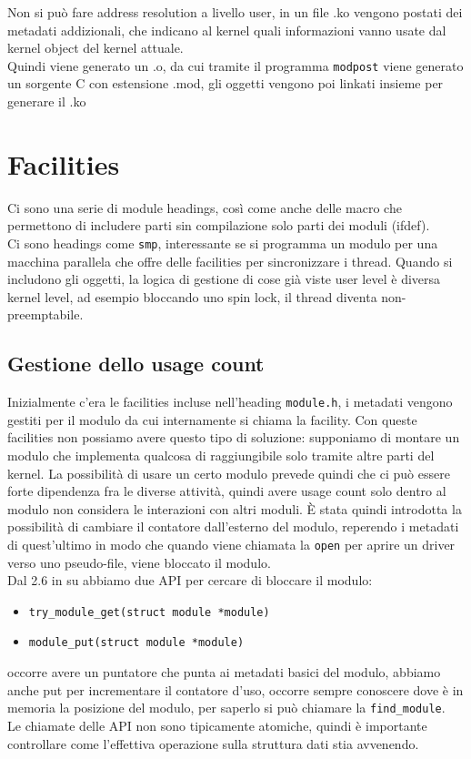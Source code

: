 \documentclass[12pt, oneside]{extbook}
\begin{document}
Non si può fare address resolution a livello user, in un file .ko vengono postati dei metadati addizionali, che indicano al kernel quali informazioni vanno usate dal kernel object del kernel attuale.\\ Quindi viene generato un .o, da cui tramite il programma \texttt{modpost} viene generato un sorgente C con estensione .mod, gli oggetti vengono poi linkati insieme per generare il .ko\\
\section{Facilities}
Ci sono una serie di module headings, così come anche delle macro che permettono di includere parti sin compilazione solo parti dei moduli (ifdef).\\ Ci sono headings come \texttt{smp}, interessante se si programma un modulo per una macchina parallela che offre delle facilities per sincronizzare i thread. Quando si includono gli oggetti, la logica di gestione di cose già viste user level è diversa kernel level, ad esempio bloccando uno spin lock, il thread diventa non-preemptabile.
\subsection{Gestione dello usage count}
Inizialmente c'era le facilities incluse nell'heading \texttt{module.h}, i metadati vengono gestiti per il modulo da cui internamente si chiama la facility. Con queste facilities non possiamo avere questo tipo di soluzione: supponiamo di montare un modulo che implementa qualcosa di raggiungibile solo tramite altre parti del kernel. La possibilità di usare un certo modulo prevede quindi che ci può essere forte dipendenza fra le diverse attività, quindi avere usage count solo dentro al modulo non considera le interazioni con altri moduli. È stata quindi introdotta la possibilità di cambiare il contatore dall'esterno del modulo, reperendo i metadati di quest'ultimo in modo che quando viene chiamata la \texttt{open} per aprire un driver verso uno pseudo-file, viene bloccato il modulo.\\Dal 2.6 in su abbiamo due API per cercare di bloccare il modulo:
\begin{itemize}
	\item \texttt{try\_module\_get(struct module *module)}
	\item \texttt{module\_put(struct module *module)}
\end{itemize}
occorre avere un puntatore che punta ai metadati basici del modulo, abbiamo anche put per incrementare il contatore d'uso, occorre sempre conoscere dove è in memoria la posizione del modulo, per saperlo si può chiamare la \texttt{find\_module}.\\Le chiamate delle API non sono tipicamente atomiche, quindi è importante controllare come l'effettiva operazione sulla struttura dati stia avvenendo.
\end{document}

